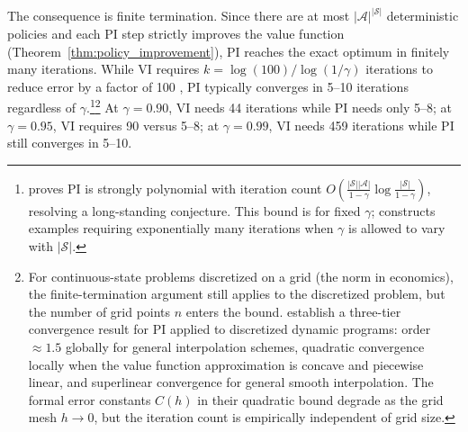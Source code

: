 The consequence is finite termination. Since there are at most $|\mathcal{A}|^{|\mathcal{S}|}$ deterministic policies and each PI step strictly improves the value function (Theorem~\ref{thm:policy_improvement}), PI reaches the exact optimum in finitely many iterations. While VI requires $k = \log(100) / \log(1/\gamma)$ iterations to reduce error by a factor of 100 \citep{bertsekas1996}, PI typically converges in 5--10 iterations regardless of $\gamma$.\footnote{\citet{ye2011} proves PI is strongly polynomial with iteration count $O\!\left(\frac{|\mathcal{S}||\mathcal{A}|}{1-\gamma}\log\frac{|\mathcal{S}|}{1-\gamma}\right)$, resolving a long-standing conjecture. This bound is for fixed $\gamma$; \citet{fearnley2010} constructs examples requiring exponentially many iterations when $\gamma$ is allowed to vary with $|\mathcal{S}|$.}\footnote{For continuous-state problems discretized on a grid (the norm in economics), the finite-termination argument still applies to the discretized problem, but the number of grid points $n$ enters the bound. \citet{santos2004} establish a three-tier convergence result for PI applied to discretized dynamic programs: order $\approx 1.5$ globally for general interpolation schemes, quadratic convergence locally when the value function approximation is concave and piecewise linear, and superlinear convergence for general smooth interpolation. The formal error constants $C(h)$ in their quadratic bound degrade as the grid mesh $h \to 0$, but the iteration count is empirically independent of grid size.} At $\gamma = 0.90$, VI needs 44 iterations while PI needs only 5--8; at $\gamma = 0.95$, VI requires 90 versus 5--8; at $\gamma = 0.99$, VI needs 459 iterations while PI still converges in 5--10.

